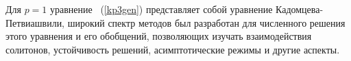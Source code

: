 Для $ p = 1 $ уравнение ~(\ref {kp3gen}) представляет собой уравнение Кадомцева-Петвиашвили, широкий спектр методов \cite{porrogue, Lu2003, Klein2007, Infeld1995, Kao2012, Kodama2009} был разработан для численного решения этого уравнения и его обобщений, позволяющих изучать взаимодействия солитонов, устойчивость решений, асимптотические режимы и другие аспекты. 


